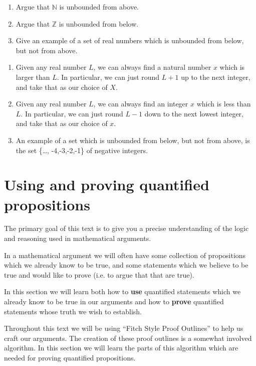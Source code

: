 \begin{xca}
		\begin{enumerate}
				\item Argue that $\mathbb{N}$ is unbounded from above.
				\item Argue that $\mathbb{Z}$ is unbounded from below.
				\item Give an example of a set of real numbers which is unbounded from below, but not from above.
			\end{enumerate}
	\end{xca}

\begin{solutions}
	\begin{enumerate}
		\item Given any real number $L$, we can always find a natural number $x$ which is larger than $L$.  In particular, we can just round $L+1$ up to the next integer, and take that as our choice of $X$.
		\item Given any real number $L$, we can always find an integer $x$ which is less than $L$.  In particular, we can just round $L-1$ down to the next lowest integer, and take that as our choice of $x$.
		\item An example of a set which is unbounded from below, but not from above, is the set \{\dots, -4,-3,-2,-1\} of negative integers. 
	\end{enumerate}
\end{solutions}

\section{Using and proving quantified propositions}

The primary goal of this text is to give you a precise understanding of the logic and reasoning used in mathematical arguments.  

In a mathematical argument we will often have some collection of propositions which we already know to be true, and some statements which we believe to be true and would like to prove (i.e. to argue that that are true).

In this section we will learn both how to \textbf{use} quantified statements which we already know to be true in our arguments and how to \textbf{prove} quantified statements whose truth we wish to establish.

Throughout this text we will be using ``Fitch Style Proof Outlines'' to help us craft our arguments.  The creation of these proof outlines is a somewhat involved algorithm.  In this section we will learn the parts of this algorithm which are needed for proving quantified propositions. 

